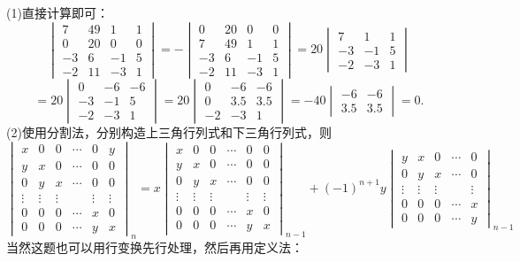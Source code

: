 \begin{solution}
    (1)直接计算即可：
    \[\begin{vmatrix}7&49&1&1\\0&20&0&0\\-3&6&-1&5\\-2&11&-3&1\end{vmatrix}
    =-\begin{vmatrix}0&20&0&0\\7&49&1&1\\-3&6&-1&5\\-2&11&-3&1\end{vmatrix}
    =20\begin{vmatrix}7&1&1\\-3&-1&5\\-2&-3&1\end{vmatrix}\]\[
    =20\begin{vmatrix}0&-6&-6\\-3&-1&5\\-2&-3&1\end{vmatrix}
    =20\begin{vmatrix}0&-6&-6\\0&3.5&3.5\\-2&-3&1\end{vmatrix}
    =-40\begin{vmatrix}-6&-6\\3.5&3.5\end{vmatrix}=0.
    \]
    (2)使用分割法，分别构造上三角行列式和下三角行列式，则\[
    \begin{vmatrix}x&0&0&\cdots&0&y\\y&x&0&\cdots&0&0\\0&y&x&\cdots&0&0\\\vdots&\vdots&\vdots&&\vdots&\vdots\\0&0&0&\cdots&x&0\\0&0&0&\cdots&y&x\end{vmatrix}_n
    =x\begin{vmatrix}x&0&0&\cdots&0&0\\y&x&0&\cdots&0&0\\0&y&x&\cdots&0&0\\\vdots&\vdots&\vdots&&\vdots&\vdots\\0&0&0&\cdots&x&0\\0&0&0&\cdots&y&x\end{vmatrix}_{n-1}+(-1)^{n+1}y\begin{vmatrix}y&x&0&\cdots&0\\0&y&x&\cdots&0\\\vdots&\vdots&\vdots&&\vdots\\0&0&0&\cdots&x\\0&0&0&\cdots&y\end{vmatrix}_{n-1}
    \]
    当然这题也可以用行变换先行处理，然后再用定义法：
\end{solution}
